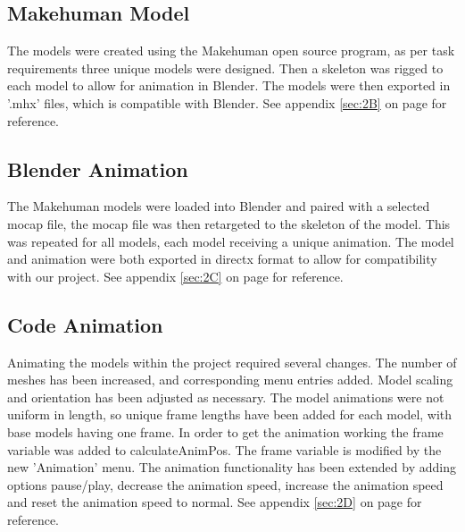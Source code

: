 \documentclass{article}
\begin{document}
\subsection{Makehuman Model}
The models were created using the Makehuman open source program, as per task requirements three unique models were designed. Then a skeleton was rigged to each model to allow for animation in Blender. The models were then exported in '.mhx' files, which is compatible with Blender.
\newline
\newline
See appendix \ref{sec:2B} on page \pageref{sec:2B} for reference.



\subsection{Blender Animation}
The Makehuman models were loaded into Blender and paired with a selected mocap file, the mocap file was then retargeted to the skeleton of the model. This was repeated for all models, each model receiving a unique animation. The model and animation were both exported in directx format to allow for compatibility with our project.
\newline
\newline
See appendix \ref{sec:2C} on page \pageref{sec:2C} for reference.

\subsection{Code Animation}

Animating the models within the project required several changes. The number of meshes has been increased, and corresponding menu entries added. Model scaling and orientation has been adjusted as necessary. The model animations were not uniform in length, so unique frame lengths have been added for each model, with base models having one frame. In order to get the animation working the frame variable was added to calculateAnimPos. The frame variable is modified by the new 'Animation' menu. The animation functionality has been extended by adding options pause/play, decrease the animation speed, increase the animation speed and reset the animation speed to normal.
\newline
\newline
See appendix \ref{sec:2D} on page \pageref{sec:2D} for reference.
\end{document}
